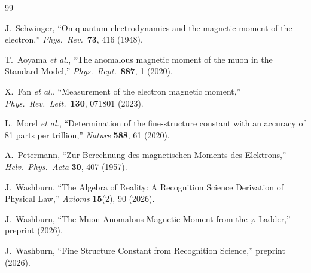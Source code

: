 \documentclass[12pt,a4paper]{article}
\theoremstyle{definition}
\theoremstyle{remark}
\begin{document}
\begin{thebibliography}{99}

J.~Schwinger, ``On quantum-electrodynamics and the magnetic moment
of the electron,'' \textit{Phys.\ Rev.}\ \textbf{73}, 416 (1948).

T.~Aoyama \textit{et al.}, ``The anomalous magnetic moment of the
muon in the Standard Model,'' \textit{Phys.\ Rept.}\ \textbf{887},
1 (2020).

X.~Fan \textit{et al.}, ``Measurement of the electron magnetic moment,''
\textit{Phys.\ Rev.\ Lett.}\ \textbf{130}, 071801 (2023).

L.~Morel \textit{et al.}, ``Determination of the fine-structure constant
with an accuracy of 81 parts per trillion,'' \textit{Nature}
\textbf{588}, 61 (2020).

A.~Petermann, ``Zur Berechnung des magnetischen Moments des Elektrons,''
\textit{Helv.\ Phys.\ Acta} \textbf{30}, 407 (1957).

J.~Washburn, ``The Algebra of Reality: A Recognition Science Derivation
of Physical Law,'' \textit{Axioms} \textbf{15}(2), 90 (2026).

J.~Washburn, ``The Muon Anomalous Magnetic Moment from the $\varphi$-Ladder,''
preprint (2026).

J.~Washburn, ``Fine Structure Constant from Recognition Science,''
preprint (2026).

\end{thebibliography}
\end{document}
